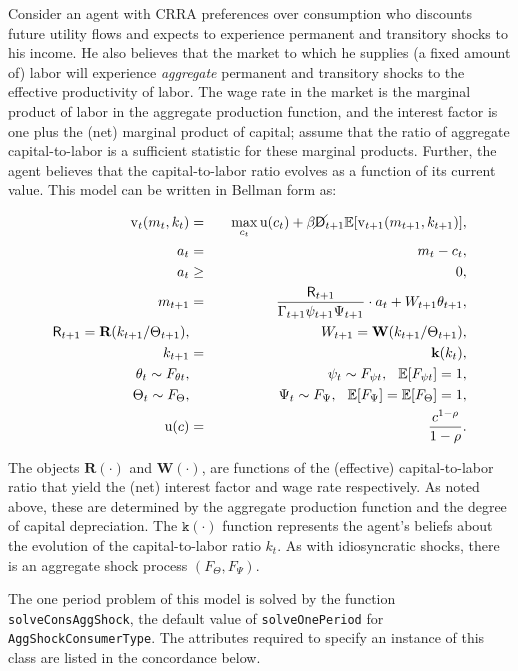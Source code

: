 \documentclass[12pt,titlepage,letterpaper]{econtex}
\newcommand{\E}{\mathbb{E}}
\begin{document}
Consider an agent with CRRA preferences over consumption who discounts future utility flows and expects to experience permanent and transitory shocks to his income.  He also believes that the market to which he supplies (a fixed amount of) labor will experience \textit{aggregate} permanent and transitory shocks to the effective productivity of labor.  The wage rate in the market is the marginal product of labor in the aggregate production function, and the interest factor is one plus the (net) marginal product of capital; assume that the ratio of aggregate capital-to-labor is a sufficient statistic for these marginal products.  Further, the agent believes that the capital-to-labor ratio evolves as a function of its current value.  This model can be written in Bellman form as:

\begin{eqnarray*}
\vFunc_t(m_t,k_t) &=& \max_{c_t} \utilFunc(c_t) + \beta \PLives_{t+1} \E [\vFunc_{t+1}(m_{t+1},k_{t+1}) ], \\
a_t &=& m_t - c_t, \\
a_t &\geq& 0, \\
m_{t+1} &=& \frac{\Rfree_{t+1}}{\Gamma_{t+1}\psi_{t+1} \Psi_{t+1}} \cdot a_t + W_{t+1} \theta_{t+1}, \\
\Rfree_{t+1} = \textbf{R}(k_{t+1}/\Theta_{t+1}), & & W_{t+1} = \textbf{W}(k_{t+1}/\Theta_{t+1}), \\
k_{t+1} &=& \textbf{k}(k_t), \\
\theta_t \sim F_{\theta t}, &\qquad& \psi_t \sim F_{\psi t}, \hspace{0.25cm} \E[F_{\psi t}] = 1, \\
\Theta_t \sim F_{\Theta}, &\qquad& \Psi_t \sim F_{\Psi}, \hspace{0.25cm} \E[F_{\Psi}] = \E[F_{\Theta}] = 1, \\
\utilFunc(c) &=& \frac{c^{1-\CRRA}}{1-\CRRA}.
\end{eqnarray*}

The objects $\textbf{R}(\cdot)$ and $\textbf{W}(\cdot)$, are functions of the (effective) capital-to-labor ratio that yield the (net) interest factor and wage rate respectively.  As noted above, these are determined by the aggregate production function and the degree of capital depreciation.  The $\texttt{k}(\cdot)$ function represents the agent's beliefs about the evolution of the capital-to-labor ratio $k_t$.  As with idiosyncratic shocks, there is an aggregate shock process $(F_{\Theta},F_{\Psi})$.

The one period problem of this model is solved by the function \texttt{solveConsAggShock}, the default value of \texttt{solveOnePeriod} for \texttt{AggShockConsumerType}.  The attributes required to specify an instance of this class are listed in the concordance below.
\end{document}
